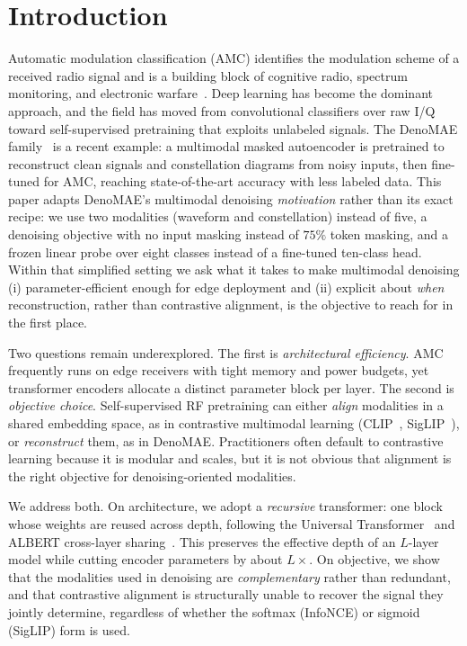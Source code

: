 \documentclass[conference]{IEEEtran}
\begin{document}
\section{Introduction}
Automatic modulation classification (AMC) identifies the modulation scheme of a
received radio signal and is a building block of cognitive radio, spectrum
monitoring, and electronic warfare~\cite{oshea2018}. Deep learning has become the
dominant approach, and the field has moved from convolutional classifiers over
raw I/Q toward self-supervised pretraining that exploits unlabeled signals.
The DenoMAE family~\cite{denomae,denomae2} is a recent example: a multimodal
masked autoencoder is pretrained to reconstruct clean signals and constellation
diagrams from noisy inputs, then fine-tuned for AMC, reaching state-of-the-art
accuracy with less labeled data. This paper adapts DenoMAE's multimodal denoising
\emph{motivation} rather than its exact recipe: we use two modalities (waveform and
constellation) instead of five, a denoising objective with no input masking instead
of $75\%$ token masking, and a frozen linear probe over eight classes instead of a
fine-tuned ten-class head. Within that simplified setting we ask what it takes to
make multimodal denoising (i) parameter-efficient enough for edge deployment and
(ii) explicit about \emph{when} reconstruction, rather than contrastive alignment,
is the objective to reach for in the first place.

Two questions remain underexplored. The first is \emph{architectural efficiency}.
AMC frequently runs on edge receivers with tight memory and power budgets, yet
transformer encoders allocate a distinct parameter block per layer. The second is
\emph{objective choice}. Self-supervised RF pretraining can either \emph{align}
modalities in a shared embedding space, as in contrastive multimodal learning
(CLIP~\cite{clip}, SigLIP~\cite{siglip}), or \emph{reconstruct} them, as in
DenoMAE. Practitioners often default to contrastive learning because it is
modular and scales, but it is not obvious that alignment is the right objective
for denoising-oriented modalities.

We address both. On architecture, we adopt a \emph{recursive} transformer: one
block whose weights are reused across depth, following the Universal
Transformer~\cite{ut} and ALBERT cross-layer sharing~\cite{albert}. This
preserves the effective depth of an $L$-layer model while cutting encoder
parameters by about $L\times$. On objective, we show that the modalities used in
denoising are \emph{complementary} rather than redundant, and that contrastive
alignment is structurally unable to recover the signal they jointly determine,
regardless of whether the softmax (InfoNCE) or sigmoid (SigLIP) form is used.
\end{document}
